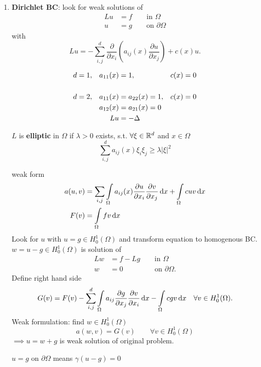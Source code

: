 \begin{enumerate}[=(\alph*)]
	\item \textbf{Dirichlet BC}:\enter
	look for weak solutions of 
	\begin{align*}
		Lu &= f \qquad \text{in } \Omega\\
		 u &= g \qquad \text{on } \partial \Omega
	\end{align*}
	with 
	\begin{equation*}
		Lu = - \displaystyle \sum^d_{i,j} \frac{\partial}{\partial x_i} \left(  a_{ij}(x) \frac{\partial u}{\partial x_j} \right) + c(x)u.
	\end{equation*}
	\begin{example}
		\begin{align*}
			d &= 1,&   a_{11}(x)&=1,              & c(x)&=0 \\
			  &    &            &				  &     &  \\
			d &= 2,&   a_{11}(x)&= a_{22}(x) = 1, & c(x)&=0 \\ 
			  &    &   a_{12}(x)&= a_{21}(x) = 0  &     &   \\
		  	  &    &         Lu &= -\Delta      &     &   \\
		\end{align*}
	\end{example}
	\begin{definition_}
		$L$ is \textbf{elliptic} in $\Omega$ if $\lambda > 0$ exists, s.t. $\forall \xi \in \mathbb{R}^d$ and  $x \in \Omega$
		\begin{equation*}
			\displaystyle \sum^d_{i,j} a_{ij}(x)\xi_i\xi_j \geq \lambda |\xi|^2
		\end{equation*}
	\end{definition_}
	weak form 
	\begin{align*}
		a(u,v) &= \displaystyle \sum_{i,j} \int \limits_\Omega a_{ij}(x)\frac{\partial u}{\partial x_i} \frac{\partial v}{\partial x_j} \mathop{}\!\mathrm{d} x + \int \limits_\Omega cuv \mathop{}\!\mathrm{d} x \\
		F(v)&= \int \limits_\Omega fv \mathop{}\!\mathrm{d} x
	\end{align*}
	Look for $u$ with $u = g \in H^1_0(\Omega)$ and transform equation to homogenous BC. $w = u - g \in H^1_0(\Omega)$ is solution of 
	\begin{align*}
		Lw &= f -Lg \qquad \text{in } \Omega\\
		 w &= 0 \qquad \qquad \ \,\text{on } \partial\Omega.
	\end{align*}
	Define right hand side
	\begin{equation*}
		G(v) = F(v) - \displaystyle \sum^d_{i,j} \int \limits_\Omega a_{ij} \frac{\partial g}{\partial x_j}\frac{\partial v}{\partial x_i} \mathop{}\!\mathrm{d} x - \int \limits_\Omega cgv \mathop{}\!\mathrm{d} x \quad \forall v\in H^1_0(\Omega).
	\end{equation*}
	Weak formulation: find $w\in H^1_0(\Omega)$ 
	\begin{equation*}
		a(w,v) = G(v) \qquad \forall v \in H^1_0(\Omega)
	\end{equation*}
	$\implies u = w +g$ is weak solution of original problem.
	\begin{comment_}
		$u = g $ on $\partial \Omega$ means $\gamma(u-g) = 0$
	\end{comment_}


\end{enumerate}
